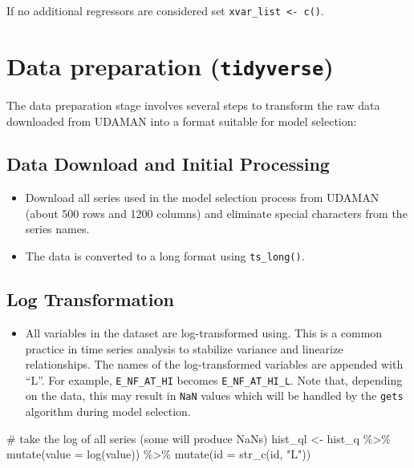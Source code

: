 \documentclass[
  letterpaper,
  DIV=11,
  numbers=noendperiod]{scrreport}
\newenvironment{Shaded}{\begin{snugshade}}{\end{snugshade}}
\newcommand{\AttributeTok}[1]{\textcolor[rgb]{0.40,0.45,0.13}{#1}}
\newcommand{\CommentTok}[1]{\textcolor[rgb]{0.37,0.37,0.37}{#1}}
\newcommand{\FunctionTok}[1]{\textcolor[rgb]{0.28,0.35,0.67}{#1}}
\newcommand{\NormalTok}[1]{\textcolor[rgb]{0.00,0.23,0.31}{#1}}
\newcommand{\OtherTok}[1]{\textcolor[rgb]{0.00,0.23,0.31}{#1}}
\newcommand{\SpecialCharTok}[1]{\textcolor[rgb]{0.37,0.37,0.37}{#1}}
\newcommand{\StringTok}[1]{\textcolor[rgb]{0.13,0.47,0.30}{#1}}
\providecommand{\tightlist}{%
  \setlength{\itemsep}{0pt}\setlength{\parskip}{0pt}}\usepackage{longtable,booktabs,array}
\begin{document}
If no additional regressors are considered set
\texttt{xvar\_list\ \textless{}-\ c()}.

\section{\texorpdfstring{Data preparation
(\texttt{tidyverse})}{Data preparation (tidyverse)}}\label{data-preparation-tidyverse}

The data preparation stage involves several steps to transform the raw
data downloaded from UDAMAN into a format suitable for model selection:

\subsection{Data Download and Initial
Processing}\label{data-download-and-initial-processing}

\begin{itemize}
\tightlist
\item
  Download all series used in the model selection process from UDAMAN
  (about 500 rows and 1200 columns) and eliminate special characters
  from the series names.\\
\item
  The data is converted to a long format using \texttt{ts\_long()}.
\end{itemize}

\subsection{Log Transformation}\label{log-transformation}

\begin{itemize}
\tightlist
\item
  All variables in the dataset are log-transformed using. This is a
  common practice in time series analysis to stabilize variance and
  linearize relationships. The names of the log-transformed variables
  are appended with ``L''. For example, \texttt{E\_NF\_AT\_HI} becomes
  \texttt{E\_NF\_AT\_HI\_L}. Note that, depending on the data, this may
  result in \texttt{NaN} values which will be handled by the
  \texttt{gets} algorithm during model selection.
\end{itemize}

\begin{Shaded}
\begin{Highlighting}[]
\CommentTok{\# take the log of all series (some will produce NaNs)}
\NormalTok{hist\_ql }\OtherTok{\textless{}{-}}\NormalTok{ hist\_q }\SpecialCharTok{\%\textgreater{}\%}
  \FunctionTok{mutate}\NormalTok{(}\AttributeTok{value =} \FunctionTok{log}\NormalTok{(value)) }\SpecialCharTok{\%\textgreater{}\%}
  \FunctionTok{mutate}\NormalTok{(}\AttributeTok{id =} \FunctionTok{str\_c}\NormalTok{(id, }\StringTok{"L"}\NormalTok{))}
\end{Highlighting}
\end{Shaded}
\end{document}

